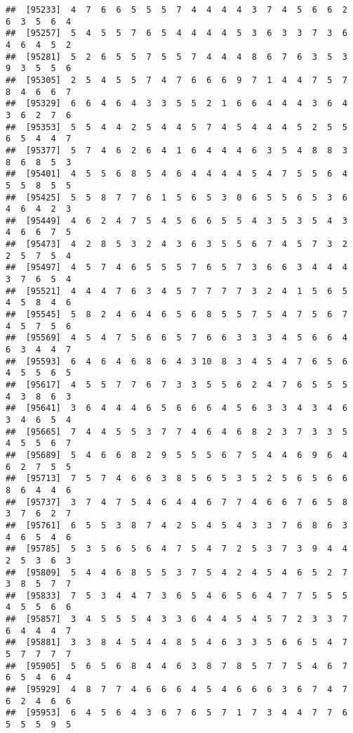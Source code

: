 \documentclass[
]{book}
\begin{document}
\begin{verbatim}
##  [95233]  4  7  6  6  5  5  5  7  4  4  4  4  3  7  4  5  6  6  2  6  3  5  6  4
##  [95257]  5  4  5  5  7  6  5  4  4  4  4  5  3  6  3  3  7  3  6  4  6  4  5  2
##  [95281]  5  2  6  5  5  7  5  5  7  4  4  4  8  6  7  6  3  5  3  9  3  5  5  6
##  [95305]  2  5  4  5  5  7  4  7  6  6  6  9  7  1  4  4  7  5  7  8  4  6  6  7
##  [95329]  6  6  4  6  4  3  3  5  5  2  1  6  6  4  4  4  3  6  4  3  6  2  7  6
##  [95353]  5  5  4  4  2  5  4  4  5  7  4  5  4  4  4  5  2  5  5  6  5  4  4  7
##  [95377]  5  7  4  6  2  6  4  1  6  4  4  4  6  3  5  4  8  8  3  8  6  8  5  3
##  [95401]  4  5  5  6  8  5  4  6  4  4  4  4  5  4  7  5  5  6  4  5  5  8  5  5
##  [95425]  5  5  8  7  7  6  1  5  6  5  3  0  6  5  5  6  5  3  6  4  6  4  2  3
##  [95449]  4  6  2  4  7  5  4  5  6  6  5  5  4  3  5  3  5  4  3  4  6  6  7  5
##  [95473]  4  2  8  5  3  2  4  3  6  3  5  5  6  7  4  5  7  3  2  2  5  7  5  4
##  [95497]  4  5  7  4  6  5  5  5  7  6  5  7  3  6  6  3  4  4  4  3  7  6  5  4
##  [95521]  4  4  4  7  6  3  4  5  7  7  7  7  3  2  4  1  5  6  5  4  5  8  4  6
##  [95545]  5  8  2  4  6  4  6  5  6  8  5  5  7  5  4  7  5  6  7  4  5  7  5  6
##  [95569]  4  5  4  7  5  6  6  5  7  6  6  3  3  3  4  5  6  6  4  6  3  4  4  7
##  [95593]  6  4  6  4  6  8  6  4  3 10  8  3  4  5  4  7  6  5  6  4  5  5  6  5
##  [95617]  4  5  5  7  7  6  7  3  3  5  5  6  2  4  7  6  5  5  5  4  3  8  6  3
##  [95641]  3  6  4  4  4  6  5  6  6  6  4  5  6  3  3  4  3  4  6  3  4  6  5  4
##  [95665]  7  4  4  5  5  3  7  7  4  6  4  6  8  2  3  7  3  3  5  4  5  5  6  7
##  [95689]  5  4  6  6  8  2  9  5  5  5  6  7  5  4  4  6  9  6  4  6  2  7  5  5
##  [95713]  7  5  7  4  6  6  3  8  5  6  5  3  5  2  5  6  5  6  6  8  6  4  4  6
##  [95737]  3  7  4  7  5  4  6  4  4  6  7  7  4  6  6  7  6  5  8  3  7  6  2  7
##  [95761]  6  5  5  3  8  7  4  2  5  4  5  4  3  3  7  6  8  6  3  4  6  5  4  6
##  [95785]  5  3  5  6  5  6  4  7  5  4  7  2  5  3  7  3  9  4  4  2  5  3  6  3
##  [95809]  5  4  4  6  8  5  5  3  7  5  4  2  4  5  4  6  5  2  7  3  8  5  7  7
##  [95833]  7  5  3  4  4  7  3  6  5  4  6  5  6  4  7  7  5  5  5  4  5  5  6  6
##  [95857]  3  4  5  5  5  4  3  3  6  4  4  5  4  5  7  2  3  3  7  6  4  4  4  7
##  [95881]  3  3  8  4  5  4  4  8  5  4  6  3  3  5  6  6  5  4  7  5  7  7  7  7
##  [95905]  5  6  5  6  8  4  4  6  3  8  7  8  5  7  7  5  4  6  7  6  5  4  6  4
##  [95929]  4  8  7  7  4  6  6  6  4  5  4  6  6  6  3  6  7  4  7  6  2  4  6  6
##  [95953]  6  4  5  6  4  3  6  7  6  5  7  1  7  3  4  4  7  7  6  5  5  5  9  5

\end{verbatim}
\end{document}
